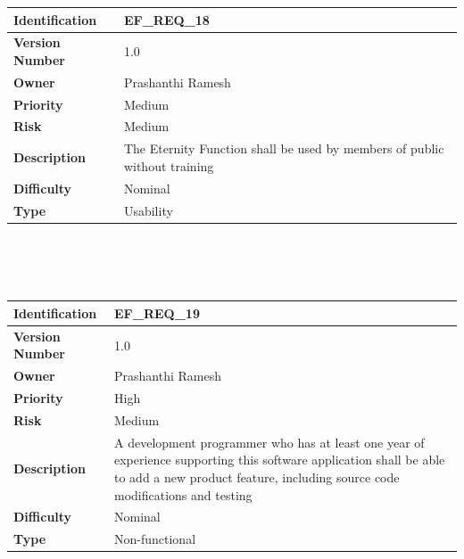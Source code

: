 \documentclass[11pt, english]{report}
\begin{document}
\setlength{\tabcolsep}{18pt}
\renewcommand{\arraystretch}{1.5}
\begin{tabular}{ |p{2.2cm}|p{9.8cm}| }
\hline
\textbf{Identification} &  EF\_REQ\_18 \\ \hline 
\textbf{Version Number} & 1.0 \\ \hline 
\textbf{Owner} & Prashanthi Ramesh  \\ \hline
\textbf{Priority} & Medium  \\ \hline
\textbf{Risk} & Medium  \\ \hline
\textbf{Description} & The Eternity Function shall be used by members of public without training \\ \hline
\textbf{Difficulty} & Nominal  \\ \hline
\textbf{Type} & Usability \\ 
\hline
\end{tabular} \\ \\ \\ 

\setlength{\tabcolsep}{18pt}
\renewcommand{\arraystretch}{1.5}
\begin{tabular}{ |p{2.2cm}|p{9.8cm}| }
\hline
\textbf{Identification} &  EF\_REQ\_19 \\ \hline 
\textbf{Version Number} & 1.0 \\ \hline 
\textbf{Owner} & Prashanthi Ramesh  \\ \hline
\textbf{Priority} & High  \\ \hline
\textbf{Risk} & Medium  \\ \hline
\textbf{Description} & A development programmer who has at least one year of experience supporting this software application shall be able to add a new product feature, including source code modifications and testing \\ \hline
\textbf{Difficulty} & Nominal  \\ \hline
\textbf{Type} & Non-functional\\ 
\hline
\end{tabular} \\ \\ \\ 
\end{document}
